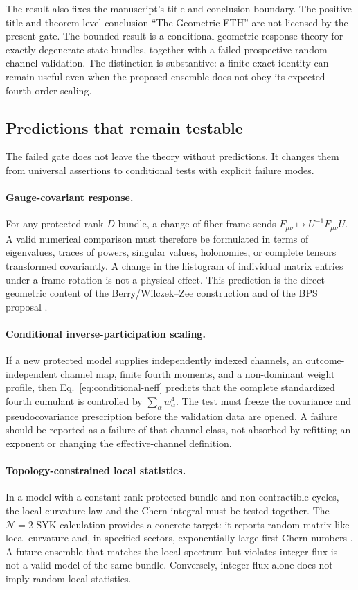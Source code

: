 The result also fixes the manuscript's title and conclusion boundary.  The
positive title and theorem-level conclusion ``The Geometric ETH'' are not
licensed by the present gate.  The bounded result is a conditional geometric
response theory for exactly degenerate state bundles, together with a failed
prospective random-channel validation.  The distinction is substantive: a
finite exact identity can remain useful even when the proposed ensemble does
not obey its expected fourth-order scaling.

\subsection{Predictions that remain testable}

The failed gate does not leave the theory without predictions.  It changes them
from universal assertions to conditional tests with explicit failure modes.

\paragraph{Gauge-covariant response.}
For any protected rank-$D$ bundle, a change of fiber frame sends
$F_{\mu\nu}\mapsto U^{-1}F_{\mu\nu}U$.  A valid numerical comparison must
therefore be formulated in terms of eigenvalues, traces of powers, singular
values, holonomies, or complete tensors transformed covariantly.  A change in
the histogram of individual matrix entries under a frame rotation is not a
physical effect.  This prediction is the direct geometric content of the
Berry/Wilczek--Zee construction \cite{berry1984,wilczekzee1984} and of the BPS
proposal \cite{chen2026berry}.

\paragraph{Conditional inverse-participation scaling.}
If a new protected model supplies independently indexed channels, an
outcome-independent channel map, finite fourth moments, and a non-dominant
weight profile, then Eq.~\eqref{eq:conditional-neff} predicts that the
complete standardized fourth cumulant is controlled by
$\sum_\alpha w_\alpha^4$.  The test must freeze the covariance and
pseudocovariance prescription before the validation data are opened.  A
failure should be reported as a failure of that channel class, not absorbed by
refitting an exponent or changing the effective-channel definition.

\paragraph{Topology-constrained local statistics.}
In a model with a constant-rank protected bundle and non-contractible cycles,
the local curvature law and the Chern integral must be tested together.  The
$\mathcal{N}=2$ SYK calculation provides a concrete target: it reports
random-matrix-like local curvature and, in specified sectors, exponentially
large first Chern numbers \cite{chen2026berry}.  A future ensemble that matches
the local spectrum but violates integer flux is not a valid model of the same
bundle.  Conversely, integer flux alone does not imply random local
statistics.

